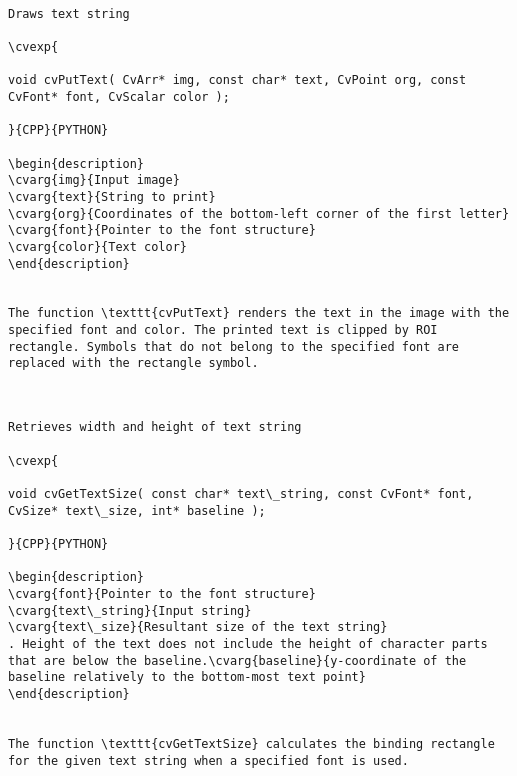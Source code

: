 \begin{verbatim}

Draws text string

\cvexp{

void cvPutText( CvArr* img, const char* text, CvPoint org, const CvFont* font, CvScalar color );

}{CPP}{PYTHON}

\begin{description}
\cvarg{img}{Input image}
\cvarg{text}{String to print}
\cvarg{org}{Coordinates of the bottom-left corner of the first letter}
\cvarg{font}{Pointer to the font structure}
\cvarg{color}{Text color}
\end{description}


The function \texttt{cvPutText} renders the text in the image with the specified font and color. The printed text is clipped by ROI rectangle. Symbols that do not belong to the specified font are replaced with the rectangle symbol.


\end{verbatim}
\begin{verbatim}

Retrieves width and height of text string

\cvexp{

void cvGetTextSize( const char* text\_string, const CvFont* font, CvSize* text\_size, int* baseline );

}{CPP}{PYTHON}

\begin{description}
\cvarg{font}{Pointer to the font structure}
\cvarg{text\_string}{Input string}
\cvarg{text\_size}{Resultant size of the text string}
. Height of the text does not include the height of character parts that are below the baseline.\cvarg{baseline}{y-coordinate of the baseline relatively to the bottom-most text point}
\end{description}


The function \texttt{cvGetTextSize} calculates the binding rectangle for the given text string when a specified font is used.


\end{verbatim}
